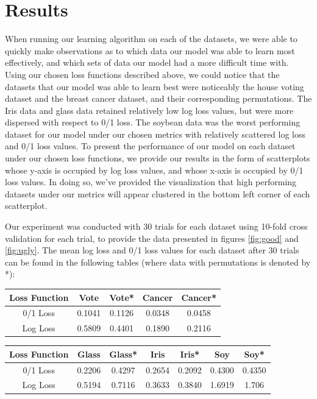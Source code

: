 \documentclass[twoside,11pt]{article}
\begin{document}
\section{Results}

When running our learning algorithm on each of the datasets, we were able to quickly make observations as to which data our model was able to learn most effectively, and which sets of data
our model had a more difficult time with. Using our chosen loss functions described above, we could notice that the datasets that our model was able to learn best were noticeably the house
voting dataset and the breast cancer dataset, and their corresponding permutations. The Iris data and glass data retained relatively low log loss values, but were more dispersed with respect 
to 0/1 loss. The soybean data was the worst performing dataset for our model under our chosen metrics with relatively scattered log loss and 0/1 loss values. To present the performance of our
model on each dataset under our chosen loss functions, we provide our results in the form of scatterplots whose y-axis is occupied by log loss values, and whose x-axis is occupied by 0/1 loss values.
In doing so, we've provided the visualization that high performing datasets under our metrics will appear clustered in the bottom left corner of each scatterplot.

Our experiment was conducted with 30 trials for each dataset using 10-fold cross validation for each trial, to provide the data presented in figures \ref{fig:good} and \ref{fig:ugly}. 
The mean log loss and 0/1 loss values for each dataset after 30 trials can be found in the following tables (where data with permutations is denoted by *):

\begin{center}
 \begin{tabular}{|c c c c c|} 
 \hline
 Loss Function & Vote & Vote* & Cancer & Cancer*\\ [0.5ex] 
 \hline\hline
 0/1 Loss & 0.1041 & 0.1126 & 0.0348 & 0.0458\\ 
 \hline
 Log Loss & 0.5809 & 0.4401 & 0.1890 & 0.2116\\  
 \hline
\end{tabular}
\end{center}

\begin{center}
 \begin{tabular}{|c c c c c c c|} 
 \hline
 Loss Function & Glass & Glass* & Iris & Iris* & Soy & Soy*\\ [0.5ex] 
 \hline\hline
 0/1 Loss  & 0.2206 & 0.4297 & 0.2654 & 0.2092 & 0.4300 & 0.4350\\ 
 \hline
 Log Loss & 0.5194 & 0.7116 & 0.3633 & 0.3840 & 1.6919 & 1.706\\  
 \hline
\end{tabular}
\end{center}
\end{document}
